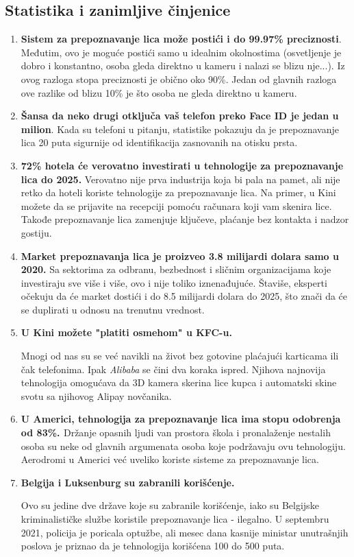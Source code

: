 \documentclass[11pt, a4paper]{article}
\begin{document}
\subsection{Statistika i zanimljive činjenice}
\begin{enumerate}
    \item \textbf{Sistem za prepoznavanje lica može postići i do 99.97\% preciznosti}. \cite{G3} 
    \break Međutim, ovo je moguće postići samo u idealnim okolnostima (osvetljenje je dobro i konstantno, osoba gleda direktno u kameru i nalazi se blizu nje...). Iz ovog razloga stopa preciznosti je obično oko 90\%. Jedan od glavnih razloga ove razlike od blizu 10\% je što osoba ne gleda direktno u kameru.
    \item \textbf{Šansa da neko drugi otključa vaš telefon preko Face ID je jedan u milion}. \cite{G4}
    \break Kada su telefoni u pitanju, statistike pokazuju da je prepoznavanje lica 20 puta sigurnije od identifikacija zasnovanih na otisku prsta.
    \item \textbf{72\% hotela će verovatno investirati u tehnologije za prepoznavanje lica do 2025.} \cite{G5}
    \break Verovatno nije prva industrija koja bi pala na pamet, ali nije retko da hoteli koriste tehnologije za prepoznavanje lica. Na primer, u Kini možete da se prijavite na recepciji pomoću računara koji vam skenira lice. Takođe prepoznavanje lica zamenjuje ključeve, plaćanje bez kontakta i nadzor gostiju.
    \item \textbf{Market prepoznavanja lica je proizveo 3.8 milijardi dolara samo u 2020.} \cite{G6}
    \break Sa sektorima za odbranu, bezbednost i sličnim organizacijama koje investiraju sve više i više, ovo i nije toliko iznenađujuće. Štaviše, eksperti očekuju da će market dostići i do 8.5 milijardi dolara do 2025, što znači da će se duplirati u odnosu na trenutnu vrednost.
    \item \begin{flushleft} \textbf{U Kini možete "platiti osmehom" u KFC-u.}  \cite{G7}\end{flushleft} 
    Mnogi od nas su se već navikli na život bez gotovine plaćajući karticama ili čak telefonima. Ipak \textit{Alibaba} se čini dva koraka ispred. Njihova najnovija tehnologija omogućava da 3D kamera skerina lice kupca i automatski skine svotu sa njihovog Alipay novčanika.
    \item \textbf{U Americi, tehnologija za prepoznavanje lica ima stopu odobrenja od 83\%. \cite{G8}} 
    \break Držanje opasnih ljudi van prostora škola i pronalaženje nestalih osoba su neke od glavnih argumenata osoba koje podržavaju ovu tehnologiju. Aerodromi u Americi već uveliko koriste sisteme za prepoznavanje lica.
    \item \begin{flushleft}  \textbf{Belgija i Luksenburg su zabranili korišćenje.} \cite{G9} \end{flushleft} 
    Ovo su jedine dve države koje su zabranile korišćenje, iako su Belgijske kriminalističke službe koristile prepoznavanje lica - ilegalno. U septembru 2021, policija je poricala optužbe, ali mesec dana kasnije ministar unutrašnjih poslova je priznao da je tehnologija korišćena 100 do 500 puta.
   

\end{enumerate}
\end{document}
